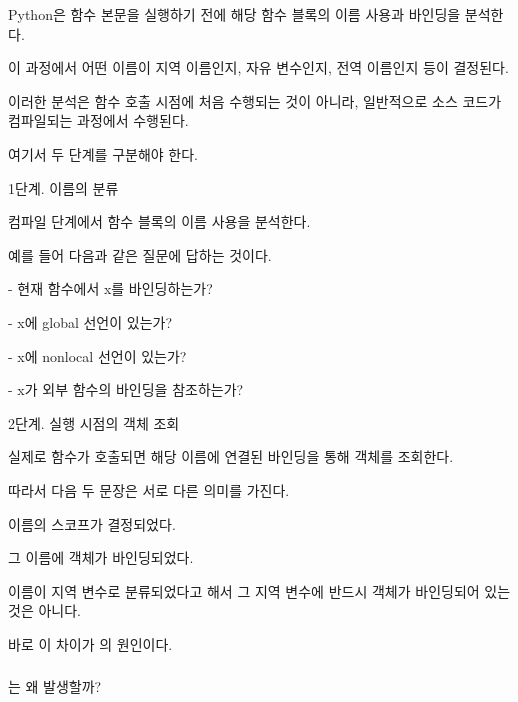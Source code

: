 Python은 함수 본문을 실행하기 전에 해당 함수 블록의 이름 사용과 바인딩을 분석한다.

이 과정에서 어떤 이름이 지역 이름인지, 자유 변수인지, 전역 이름인지 등이 결정된다.

이러한 분석은 함수 호출 시점에 처음 수행되는 것이 아니라, 일반적으로 소스 코드가 컴파일되는 과정에서 수행된다.

여기서 두 단계를 구분해야 한다.

\begin{dhknote}
\begin{dhksmry}[centered]
1단계. 이름의 분류
\end{dhksmry}
\end{dhknote}

컴파일 단계에서 함수 블록의 이름 사용을 분석한다.

예를 들어 다음과 같은 질문에 답하는 것이다.

\begin{dhksmry}
    - 현재 함수에서 x를 바인딩하는가?

    - x에 global 선언이 있는가?

    - x에 nonlocal 선언이 있는가?

    - x가 외부 함수의 바인딩을 참조하는가?
\end{dhksmry}

\begin{dhknote}
\begin{dhksmry}[centered]
2단계. 실행 시점의 객체 조회
\end{dhksmry}
\end{dhknote}

실제로 함수가 호출되면 해당 이름에 연결된 바인딩을 통해 객체를 조회한다.

따라서 다음 두 문장은 서로 다른 의미를 가진다.

\begin{dhksmry}[centered]
이름의 스코프가 결정되었다.

그 이름에 객체가 바인딩되었다.
\end{dhksmry}

이름이 지역 변수로 분류되었다고 해서 그 지역 변수에 반드시 객체가 바인딩되어 있는 것은 아니다.

바로 이 차이가 의 원인이다.

\subsubsection{}는 왜 발생할까?

